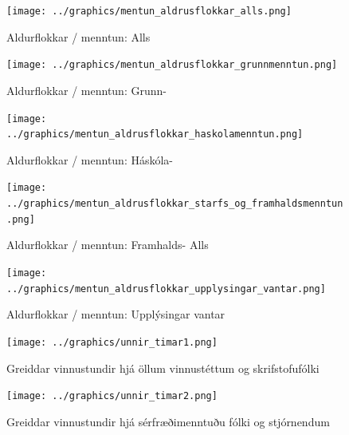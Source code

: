 \documentclass[12pt, git, draft]{rureport}
\begin{document}
\begin{figure}
	\centering 
	\texttt{[image: ../graphics/mentun\_aldrusflokkar\_alls.png]}
	\caption{Aldurflokkar / menntun: Alls \label{fig:menntunall}}
\end{figure}

\begin{figure}
	\centering 
	\texttt{[image: ../graphics/mentun\_aldrusflokkar\_grunnmenntun.png]}
	\caption{Aldurflokkar / menntun: Grunn- \label{fig:menntungrunn}}
\end{figure}

\begin{figure}
	\centering 
	\texttt{[image: ../graphics/mentun\_aldrusflokkar\_haskolamenntun.png]}
	\caption{Aldurflokkar / menntun: Háskóla- \label{fig:menntunhs}}
\end{figure}

\begin{figure}
	\centering 
	\texttt{[image: ../graphics/mentun\_aldrusflokkar\_starfs\_og\_framhaldsmenntun.png]}
	\caption{Aldurflokkar / menntun: Framhalds- Alls \label{fig:menntunfram}}
\end{figure}

\begin{figure}
	\centering 
	\texttt{[image: ../graphics/mentun\_aldrusflokkar\_upplysingar\_vantar.png]}
	\caption{Aldurflokkar / menntun: Upplýsingar vantar \label{fig:menntunvantar}}
\end{figure}

\begin{figure}
	\centering 
	\texttt{[image: ../graphics/unnir\_timar1.png]}
	\caption{Greiddar vinnustundir hjá öllum vinnustéttum og skrifstofufólki \label{fig:unnirtimar1}}
\end{figure}

\begin{figure}
	\centering 
	\texttt{[image: ../graphics/unnir\_timar2.png]}
	\caption{Greiddar vinnustundir hjá sérfræðimenntuðu fólki og stjórnendum \label{fig:unnirtimar2}}
\end{figure}

%
\printbibliography
\end{document}
